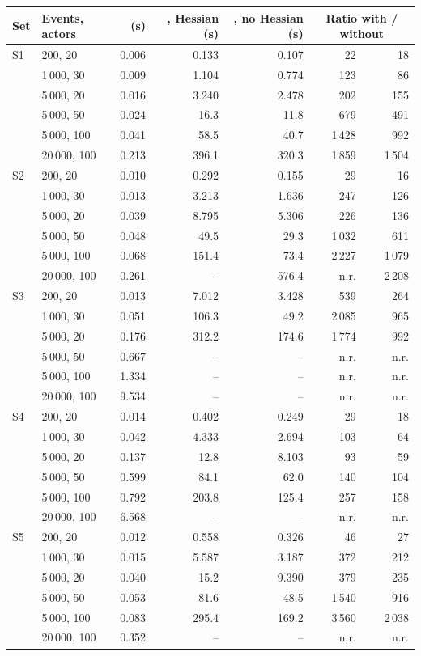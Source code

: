 \begin{longtable}{@{}llrrrrr@{}}
\toprule
Set & Events, actors & \nwrem{} (s) & \relevent{}, Hessian (s) & \relevent{}, no Hessian (s) & \multicolumn{2}{c}{Ratio with / without}\\
\midrule\endhead
S1 & 200, 20 & 0.006 & 0.133 & 0.107 & 22 & 18\\
 & 1\,000, 30 & 0.009 & 1.104 & 0.774 & 123 & 86\\
 & 5\,000, 20 & 0.016 & 3.240 & 2.478 & 202 & 155\\
 & 5\,000, 50 & 0.024 & 16.3 & 11.8 & 679 & 491\\
 & 5\,000, 100 & 0.041 & 58.5 & 40.7 & 1\,428 & 992\\
 & 20\,000, 100 & 0.213 & 396.1 & 320.3 & 1\,859 & 1\,504\\
\addlinespace
S2 & 200, 20 & 0.010 & 0.292 & 0.155 & 29 & 16\\
 & 1\,000, 30 & 0.013 & 3.213 & 1.636 & 247 & 126\\
 & 5\,000, 20 & 0.039 & 8.795 & 5.306 & 226 & 136\\
 & 5\,000, 50 & 0.048 & 49.5 & 29.3 & 1\,032 & 611\\
 & 5\,000, 100 & 0.068 & 151.4 & 73.4 & 2\,227 & 1\,079\\
 & 20\,000, 100 & 0.261 & -- & 576.4 & n.r. & 2\,208\\
\addlinespace
S3 & 200, 20 & 0.013 & 7.012 & 3.428 & 539 & 264\\
 & 1\,000, 30 & 0.051 & 106.3 & 49.2 & 2\,085 & 965\\
 & 5\,000, 20 & 0.176 & 312.2 & 174.6 & 1\,774 & 992\\
 & 5\,000, 50 & 0.667 & -- & -- & n.r. & n.r.\\
 & 5\,000, 100 & 1.334 & -- & -- & n.r. & n.r.\\
 & 20\,000, 100 & 9.534 & -- & -- & n.r. & n.r.\\
\addlinespace
S4 & 200, 20 & 0.014 & 0.402 & 0.249 & 29 & 18\\
 & 1\,000, 30 & 0.042 & 4.333 & 2.694 & 103 & 64\\
 & 5\,000, 20 & 0.137 & 12.8 & 8.103 & 93 & 59\\
 & 5\,000, 50 & 0.599 & 84.1 & 62.0 & 140 & 104\\
 & 5\,000, 100 & 0.792 & 203.8 & 125.4 & 257 & 158\\
 & 20\,000, 100 & 6.568 & -- & -- & n.r. & n.r.\\
\addlinespace
S5 & 200, 20 & 0.012 & 0.558 & 0.326 & 46 & 27\\
 & 1\,000, 30 & 0.015 & 5.587 & 3.187 & 372 & 212\\
 & 5\,000, 20 & 0.040 & 15.2 & 9.390 & 379 & 235\\
 & 5\,000, 50 & 0.053 & 81.6 & 48.5 & 1\,540 & 916\\
 & 5\,000, 100 & 0.083 & 295.4 & 169.2 & 3\,560 & 2\,038\\
 & 20\,000, 100 & 0.352 & -- & -- & n.r. & n.r.\\
\bottomrule
\end{longtable}
